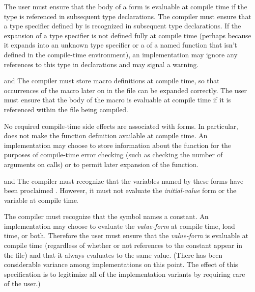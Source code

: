 \begin{flushdesc}
\item[\cdf{deftype}]
The user must ensure that the body of a  form is
    evaluable at compile time if the type is referenced in subsequent type
    declarations.  The compiler must ensure that a type
    specifier defined by 
    is recognized in subsequent type declarations.  If the
    expansion of a type specifier is not defined fully at compile time
    (perhaps because it expands into an unknown type specifier or a
     of a named function that isn't defined in the compile-time
    environment), an implementation may ignore any references to this type
    in declarations and may signal a warning.

\item[\cdf{defmacro} and \cdf{define-modify-macro}]   
The compiler must store macro
    definitions at compile time, so that occurrences of the macro later on
    in the file can be expanded correctly.  The user must ensure that the
    body of the macro is evaluable at compile time if it is referenced
    within the file being compiled.

\item[\cdf{defun}]
No required compile-time side effects are associated with  forms.
    In particular,  does not make the function definition available
    at compile time.  An implementation may choose to store information
    about the function for the purposes of compile-time error checking
    (such as checking the number of arguments on calls) or to permit later
     expansion of the function.

\item[\cdf{defvar} and \cdf{defparameter}]
The compiler must recognize that the variables
    named by these forms have been proclaimed .  However, it must
    not evaluate the \emph{initial-value} form or  the variable at compile
    time.

\item[\cdf{defconstant}]
The compiler must recognize that the symbol names a
    constant.  An implementation may choose to evaluate the \emph{value-form} at
    compile time, load time, or both.  Therefore the user must ensure that
    the \emph{value-form} is evaluable at compile time (regardless of whether or
    not references to the constant appear in the file) and that it always
    evaluates to the same value.  
    (There has been considerable
variance among implementations on this point.  The effect of this specification is
to legitimize all of the implementation variants by requiring care of the user.)


\end{flushdesc}
